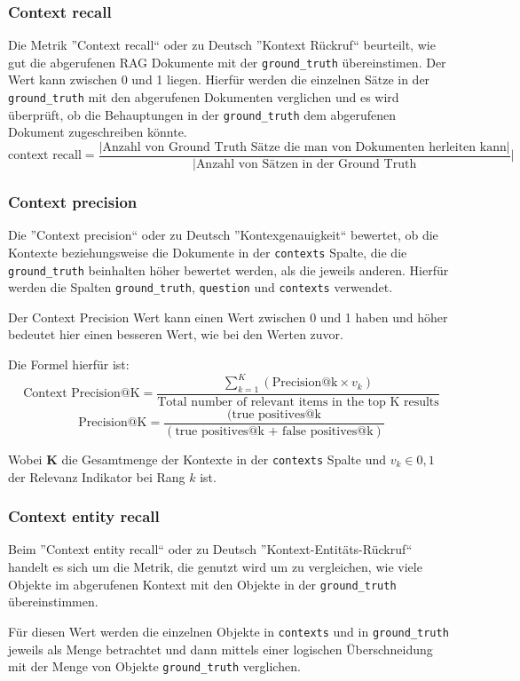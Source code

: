 \iffalse \subsubsection{Context recall}
Die Metrik ''Context recall`` oder zu Deutsch ''Kontext Rückruf`` beurteilt, 
wie gut die abgerufenen RAG Dokumente mit der \verb|ground_truth| übereinstimen.
Der Wert kann zwischen 0 und 1 liegen. Hierfür werden die einzelnen 
Sätze in der \verb|ground_truth| mit den abgerufenen Dokumenten verglichen 
und es wird überprüft, ob die Behauptungen in der \verb|ground_truth|
dem abgerufenen Dokument zugeschreiben könnte.
\[\text{context recall} = \frac{|\text{Anzahl von Ground Truth Sätze die man von Dokumenten herleiten kann}|}{|\text{Anzahl von Sätzen in der Ground Truth}}|\]

\subsubsection{Context precision}
Die ''Context precision`` oder zu Deutsch ''Kontexgenauigkeit`` bewertet,
ob die Kontexte beziehungsweise die Dokumente in der \verb|contexts| Spalte,
die die \verb|ground_truth| beinhalten höher bewertet werden, als die jeweils anderen.
Hierfür werden die Spalten \verb|ground_truth|, \verb|question| und \verb|contexts| verwendet.\par
Der Context Precision Wert kann einen Wert zwischen 0 und 1 haben und höher 
bedeutet hier einen besseren Wert, wie bei den Werten zuvor.\par
Die Formel hierfür ist: 
\[\text{Context Precision@K}=\frac{\sum_{k=1}^{K}(\text{Precision@k} \times v_k)}{\text{Total number of relevant items in the top K results}}\]
\[\text{Precision@K}=\frac{(\text{true positives@k}}{(\text{true positives@k + false positives@k})}\]

Wobei $\mathbf{K}$ die Gesamtmenge der Kontexte in der \verb|contexts| Spalte
und $v_k \in {0,1}$ der Relevanz Indikator bei Rang $k$ ist.

\subsubsection{Context entity recall}
Beim ''Context entity recall`` oder zu Deutsch ''Kontext-Entitäts-Rückruf``
handelt es sich um die Metrik, die genutzt wird um zu vergleichen, wie viele 
Objekte im abgerufenen Kontext mit den Objekte in der \verb|ground_truth|
übereinstimmen.\par
Für diesen Wert werden die einzelnen Objekte in \verb|contexts| und in 
\verb|ground_truth| jeweils als Menge betrachtet und dann mittels einer logischen 
Überschneidung mit der Menge von Objekte \verb|ground_truth| verglichen.

